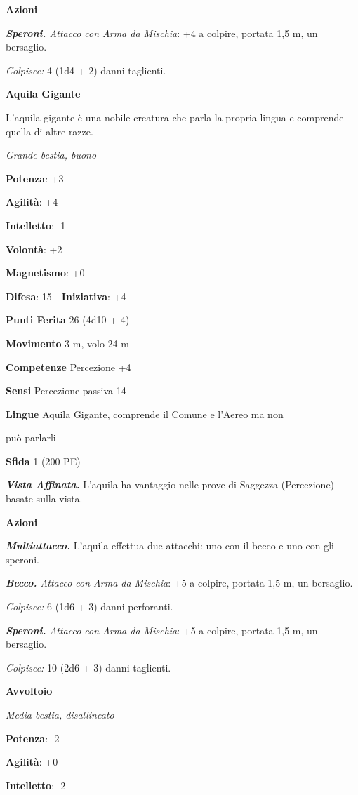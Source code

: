 \begin{multicols}{2}
\textbf{Azioni}

\emph{\textbf{Speroni.} Attacco con Arma da Mischia}: +4 a colpire,
portata 1,5 m, un bersaglio.

\emph{Colpisce:} 4 (1d4 + 2) danni taglienti.

\textbf{Aquila Gigante}

L'aquila gigante è una nobile creatura che parla la propria lingua e
comprende quella di altre razze.

\emph{Grande bestia, buono}

\textbf{Potenza}: +3

\textbf{Agilità}: +4

\textbf{Intelletto}: -1

\textbf{Volontà}: +2

\textbf{Magnetismo}: +0

\textbf{Difesa}: 15 - \textbf{Iniziativa}: +4

\textbf{Punti Ferita} 26 (4d10 + 4)

\textbf{Movimento} 3 m, volo 24 m

\textbf{Competenze} Percezione +4

\textbf{Sensi} Percezione passiva 14

\textbf{Lingue} Aquila Gigante, comprende il Comune e l'Aereo ma non

può parlarli

\textbf{Sfida} 1 (200 PE)

\emph{\textbf{Vista Affinata.}} L'aquila ha vantaggio nelle prove di
Saggezza (Percezione) basate sulla vista.

\textbf{Azioni}

\emph{\textbf{Multiattacco.}} L'aquila effettua due attacchi: uno con il
becco e uno con gli speroni.

\emph{\textbf{Becco.} Attacco con Arma da Mischia}: +5 a colpire,
portata 1,5 m, un bersaglio.

\emph{Colpisce:} 6 (1d6 + 3) danni perforanti.

\emph{\textbf{Speroni.} Attacco con Arma da Mischia}: +5 a colpire,
portata 1,5 m, un bersaglio.

\emph{Colpisce:} 10 (2d6 + 3) danni taglienti.

\textbf{Avvoltoio}

\emph{Media bestia, disallineato}

\textbf{Potenza}: -2

\textbf{Agilità}: +0

\textbf{Intelletto}: -2


\end{multicols}
